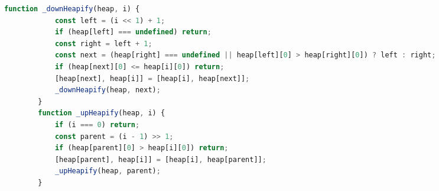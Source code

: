 \begin{multicols}{2}
\begin{lstlisting}[language={Javascript}]
        function _downHeapify(heap, i) {
            const left = (i << 1) + 1;
            if (heap[left] === undefined) return;
            const right = left + 1;
            const next = (heap[right] === undefined || heap[left][0] > heap[right][0]) ? left : right;
            if (heap[next][0] <= heap[i][0]) return;
            [heap[next], heap[i]] = [heap[i], heap[next]];
            _downHeapify(heap, next);
        }
        function _upHeapify(heap, i) {
            if (i === 0) return; 
            const parent = (i - 1) >> 1;
            if (heap[parent][0] > heap[i][0]) return;
            [heap[parent], heap[i]] = [heap[i], heap[parent]];
            _upHeapify(heap, parent);
        }
    \end{lstlisting}
    
\end{multicols}

